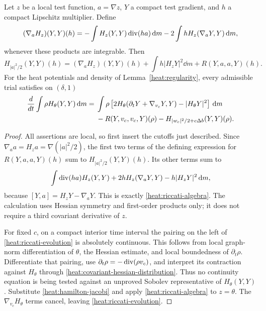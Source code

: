 \begin{lemma}
\label{heat:riccati-identity}
Let \(z\) be a local test function, \(a=\nabla z\), \(Y\) a
compact test gradient, and \(h\) a compact Lipschitz
multiplier. Define
\begin{equation}
\label{heat:covariant-hessian-distribution}
(\nabla_aH_z)(Y,Y)(h)
=-\int H_z(Y,Y)\operatorname{div}(ha)\,\mathrm d m
-2\int hH_z(\nabla_aY,Y)\,\mathrm d m,
\end{equation}
whenever these products are integrable. Then
\begin{equation}
\label{heat:riccati-algebra}
H_{|a|^2/2}(Y,Y)(h)
=(\nabla_aH_z)(Y,Y)(h)
+\int h|H_zY|^2\dd m+R(Y,a,a,Y)(h).
\end{equation}
For the heat potentials and density of
Lemma~\ref{heat:regularity}, every admissible trial satisfies
on \((\delta,1)\)
\begin{align}
\label{heat:riccati-evolution}
\frac d{dt}\int\rho H_\theta(Y,Y)\,\mathrm d m
={}&\int\rho\left[
2H_\theta(\partial_tY+\nabla_{v_c}Y,Y)-|H_\theta Y|^2
\right]\,\mathrm d m\notag\\
&-R(Y,v_c,v_c,Y)(\rho)
-H_{|w_c|^2/2+c\Delta b}(Y,Y)(\rho).
\end{align}
\end{lemma}

\begin{proof}
All assertions are local, so first insert the cutoffs just
described. Since \(\nabla_a a=H_za=\nabla(|a|^2/2)\), the
first two terms of the defining expression for
\(R(Y,a,a,Y)(h)\) sum to
\(H_{|a|^2/2}(Y,Y)(h)\). Its other terms sum to
\[
\int\operatorname{div}(ha)H_z(Y,Y)
+2hH_z(\nabla_aY,Y)-h|H_zY|^2\,\mathrm d m,
\]
because \([Y,a]=H_zY-\nabla_aY\). This is exactly
\eqref{heat:riccati-algebra}. The calculation uses Hessian
symmetry and first-order products only; it does not require a
third covariant derivative of \(z\).

For fixed \(c\), on a compact interior time interval the
pairing on the left of \eqref{heat:riccati-evolution} is
absolutely continuous. This follows from local graph-norm
differentiation of \(\theta\), the Hessian estimate, and local
boundedness of \(\partial_t\rho\). Differentiate that pairing,
use \(\partial_t\rho=-\operatorname{div}(\rho v_c)\), and interpret its
contraction against \(H_\theta\) through
\eqref{heat:covariant-hessian-distribution}. Thus no continuity
equation is being tested against an unproved Sobolev
representative of \(H_\theta(Y,Y)\). Substitute
\eqref{heat:hamilton-jacobi} and apply
\eqref{heat:riccati-algebra} to \(z=\theta\). The
\(\nabla_{v_c}H_\theta\) terms cancel, leaving
\eqref{heat:riccati-evolution}.
\end{proof}

